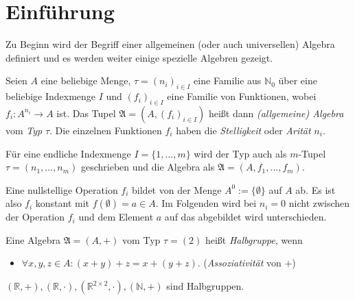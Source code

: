 \section{Einführung}

Zu Beginn wird der Begriff einer allgemeinen (oder auch universellen) Algebra definiert und es werden weiter einige spezielle Algebren gezeigt.

\begin{definition}\label{def:algebra}
    Seien $A$ eine beliebige Menge, $\tau = (n_i)_{i \in I}$ eine Familie aus $\mathbb{N}_0$ über eine beliebige Indexmenge $I$ und $(f_i)_{i \in I}$ eine Familie von Funktionen, wobei $f_i: A^{n_i} \to A$ ist. 
     Das Tupel $\mathfrak{A} = (A, (f_i)_{i \in I})$ heißt dann \emph{(allgemeine) Algebra} vom \emph{Typ} $\tau$. Die einzelnen Funktionen $f_i$ haben die \emph{Stelligkeit} oder \emph{Arität} $n_i$.
\end{definition}

\begin{remark}
    Für eine endliche Indexmenge $I = \{1, \ldots, m\}$ wird der Typ auch als $m$-Tupel $\tau = (n_1, \ldots, n_m)$ geschrieben und die Algebra als $\mathfrak{A} = (A, f_1, \ldots, f_m)$.
\end{remark}

\begin{remark}
    Eine nullstellige Operation $f_i$ bildet von der Menge $A^0 := \{\emptyset\}$ auf $A$ ab. Es ist also $f_i$ konstant mit $f(\emptyset) = a \in A$. Im Folgenden wird bei $n_i = 0$ nicht zwischen der Operation $f_i$ und dem Element $a$ auf das abgebildet wird unterschieden.
\end{remark}

\begin{definition}
    Eine Algebra $\mathfrak{A} = (A, +)$ vom Typ $\tau = (2)$ heißt \emph{Halbgruppe}, wenn 
    \begin{itemize}[topsep=0pt, label={--}]
        \item $\forall x,y,z \in A: (x + y) + z = x + (y + z)$. \tab (\emph{Assoziativität} von $+$)
    \end{itemize}
\end{definition}

\begin{example} $(\mathbb{R}, +), (\mathbb{R}, \cdot), (\mathbb{R}^{2\times 2}, \cdot), (\mathbb{N}, +)$ sind Halbgruppen.
\end{example}

